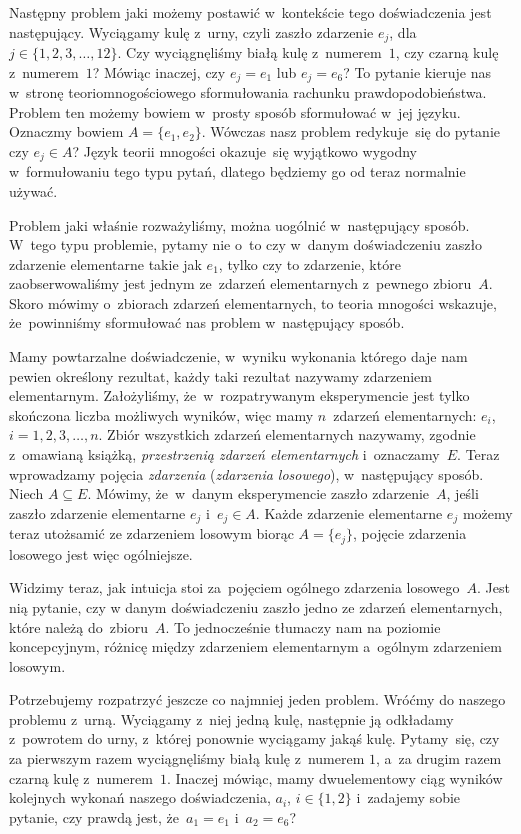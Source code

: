 \documentclass[a4paper,11pt]{article}
\numberwithin{equation}{section}
\begin{document}
Następny problem jaki możemy postawić w~kontekście tego doświadczenia jest
następujący. Wyciągamy kulę z~urny, czyli zaszło zdarzenie $e_{ j }$, dla
$j \in \{ 1, 2, 3,\ldots, 12 \}$. Czy wyciągnęliśmy białą kulę z~numerem~$1$, czy
czarną kulę z~numerem~$1$? Mówiąc inaczej, czy $e_{ j } = e_{ 1 }$ lub
$e_{ j } = e_{ 6 }$? To pytanie kieruje nas w~stronę teoriomnogościowego
sformułowania rachunku prawdopodobieństwa. Problem ten możemy bowiem w~prosty
sposób sformułować w~jej języku. Oznaczmy bowiem
$A = \{ e_{ 1 }, e_{ 2 } \}$. Wówczas nasz problem redykuje~się do pytanie
czy $e_{ j } \in A$? Język teorii mnogości okazuje~się wyjątkowo wygodny
w~formułowaniu tego typu pytań, dlatego będziemy go od teraz normalnie
używać.

Problem jaki właśnie rozważyliśmy, można uogólnić w~następujący sposób.
W~tego typu problemie, pytamy nie o~to czy w~danym doświadczeniu
zaszło zdarzenie elementarne takie jak $e_{ 1 }$, tylko czy
to zdarzenie, które zaobserwowaliśmy jest jednym ze~zdarzeń elementarnych
z~pewnego zbioru~$A$. Skoro mówimy o~zbiorach zdarzeń elementarnych, to
teoria mnogości wskazuje, że~powinniśmy sformułować nas problem
w~następujący sposób.

Mamy powtarzalne doświadczenie, w~wyniku wykonania którego daje nam pewien
określony rezultat, każdy taki rezultat nazywamy zdarzeniem elementarnym.
Założyliśmy,
że~w~rozpatrywanym eksperymencie jest tylko skończona liczba możliwych
wyników, więc mamy $n$~zdarzeń elementarnych: $e_{ i }$, $i = 1, 2, 3,\ldots, n$.
Zbiór wszystkich zdarzeń elementarnych nazywamy, zgodnie z~omawianą książką,
\textit{przestrzenią zdarzeń elementarnych} i~oznaczamy~$E$. Teraz
wprowadzamy pojęcia \textit{zdarzenia} (\textit{zdarzenia losowego}),
w~następujący sposób. Niech $A \subseteq E$. Mówimy, że~w~danym eksperymencie
zaszło zdarzenie~$A$, jeśli zaszło zdarzenie elementarne $e_{ j }$
i~$e_{ j } \in A$. Każde zdarzenie elementarne $e_{ j }$ możemy teraz utożsamić
ze zdarzeniem losowym biorąc $A = \{ e_{ j } \}$, pojęcie zdarzenia losowego
jest więc ogólniejsze.

Widzimy teraz, jak intuicja stoi za~pojęciem ogólnego zdarzenia
losowego~$A$. Jest nią pytanie, czy w danym doświadczeniu zaszło jedno ze
zdarzeń elementarnych, które należą do~zbioru~$A$. To jednocześnie tłumaczy
nam na poziomie koncepcyjnym, różnicę między zdarzeniem elementarnym
a~ogólnym zdarzeniem losowym.

Potrzebujemy rozpatrzyć jeszcze co najmniej jeden problem. Wróćmy do naszego
problemu z~urną. Wyciągamy z~niej jedną kulę, następnie ją odkładamy
z~powrotem do urny, z~której ponownie wyciągamy jakąś kulę. Pytamy~się, czy
za pierwszym razem wyciągnęliśmy białą kulę z~numerem $1$, a~za drugim razem
czarną kulę z~numerem~$1$. Inaczej mówiąc, mamy dwuelementowy ciąg wyników
kolejnych wykonań naszego doświadczenia, $a_{ i }$, $i \in \{ 1, 2 \}$ i~zadajemy
sobie pytanie, czy prawdą jest, że~$a_{ 1 } = e_{ 1 }$ i~$a_{ 2 } = e_{ 6 }$?
\end{document}
